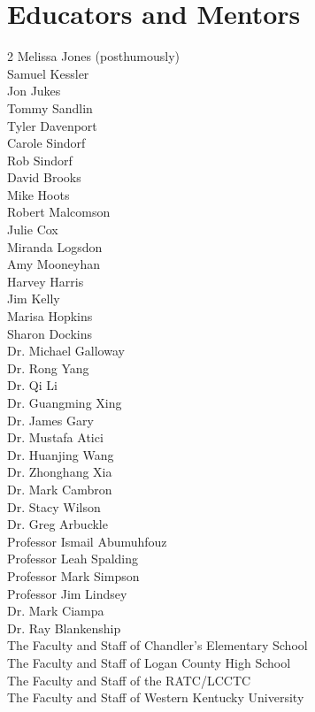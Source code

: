 \section{Educators and Mentors}
    \centering
    \begin{multicols}{2}
        Melissa Jones (posthumously) \\
        Samuel Kessler \\
        Jon Jukes \\
        Tommy Sandlin \\
        Tyler Davenport \\
        Carole Sindorf \\
        Rob Sindorf \\
        David Brooks \\
        Mike Hoots \\
        Robert Malcomson \\
        Julie Cox \\
        Miranda Logsdon \\
        Amy Mooneyhan \\
        Harvey Harris \\
        Jim Kelly \\
        Marisa Hopkins \\
        Sharon Dockins \\
        Dr. Michael Galloway \\
        Dr. Rong Yang \\
        Dr. Qi Li \\
        Dr. Guangming Xing \\
        Dr. James Gary \\
        Dr. Mustafa Atici \\
        Dr. Huanjing Wang \\
        Dr. Zhonghang Xia \\
        Dr. Mark Cambron \\
        Dr. Stacy Wilson \\
        Dr. Greg Arbuckle \\
        Professor Ismail Abumuhfouz \\
        Professor Leah Spalding \\
        Professor Mark Simpson \\
        Professor Jim Lindsey \\
        Dr. Mark Ciampa \\
        Dr. Ray Blankenship \\
        The Faculty and Staff of Chandler's Elementary School \\
        The Faculty and Staff of Logan County High School \\
        The Faculty and Staff of the RATC/LCCTC \\
        The Faculty and Staff of Western Kentucky University
    \end{multicols}